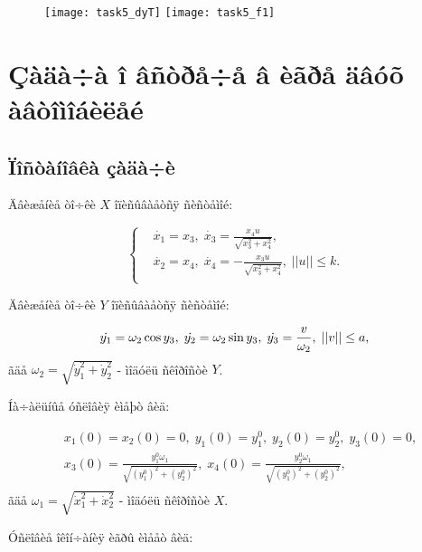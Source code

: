 \documentclass[14pt]{article}
\begin{document}
\begin{figure}
\begin{floatrow}
    {\texttt{[image: task5\_dyT]}}
    {\texttt{[image: task5\_f1]}}
\end{floatrow}
\end{figure}

\newpage
\section{Çàäà÷à î âñòðå÷å â èãðå äâóõ àâòîìîáèëåé}
\subsection{Ïîñòàíîâêà çàäà÷è}

Äâèæåíèå òî÷êè $X$ îïèñûâàåòñÿ ñèñòåìîé:

\begin{equation}\label{syst6}
\left\{ \begin{aligned}
& \dot{x_1} = x_3, \;  \dot{x_3} = \frac{x_4 u}{\sqrt{x_3^2+x_4^2}}, \\
& \dot{x_2} = x_4, \;  \dot{x_4} = - \frac{x_3 u}{\sqrt{x_3^2+x_4^2}}, \; ||u|| \le k.\\
\end{aligned}\right.
\end{equation}

Äâèæåíèå òî÷êè $Y$ îïèñûâàåòñÿ ñèñòåìîé:

\begin{equation}\label{syst7}
 \dot{y_1} = \omega_2\cos{y_3}, \;  \dot{y_2} = \omega_2\sin{y_3}, \; \dot{y_3} =  \frac{v}{\omega_2},\; ||v|| \le a,\\
\end{equation}
ãäå $\omega_2 = \sqrt{\dot{y}_1^2+\dot{y}_2^2}$ - ìîäóëü ñêîðîñòè $Y$.

Íà÷àëüíûå óñëîâèÿ èìåþò âèä:

$$
\begin{aligned}
& x_1(0) = x_2(0) = 0,\; y_1(0) = y_1^0,\; y_2(0) = y_2^0,\; y_3(0) = 0,\\
& x_3(0) = \frac{y_1^0 \omega_1}{\sqrt{(y_1^0)^2+(y_2^0)^2}}, \; x_4(0) = \frac{y_2^0 \omega_1}{\sqrt{(y_1^0)^2+(y_2^0)^2}}, \\
\end{aligned}
$$
ãäå $\omega_1 = \sqrt{\dot{x}_1^2+\dot{x}_2^2}$ - ìîäóëü ñêîðîñòè $X$.

Óñëîâèå îêîí÷àíèÿ èãðû èìååò âèä:
\end{document}
